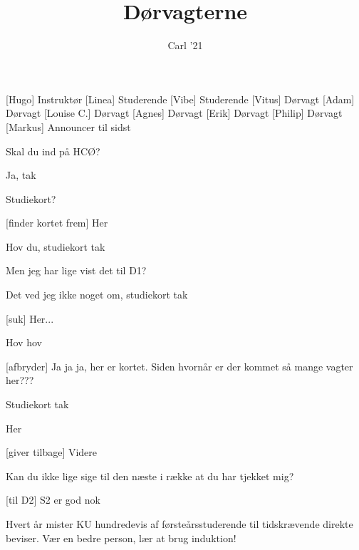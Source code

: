 \documentclass[a4paper,11pt]{article}
\title{Dørvagterne}
\author{Carl '21}
\begin{document}
\maketitle

\begin{roles}
[Hugo] Instruktør
[Linea] Studerende
[Vibe] Studerende
[Vitus] Dørvagt
[Adam] Dørvagt
[Louise C.] Dørvagt
[Agnes] Dørvagt
[Erik] Dørvagt
[Philip] Dørvagt
[Markus] Announcer til sidst
\end{roles}

\begin{sketch}

 Skal du ind på HCØ?

 Ja, tak

 Studiekort?

[finder kortet frem] Her


 Hov du, studiekort tak

 Men jeg har lige vist det til D1?

 Det ved jeg ikke noget om, studiekort tak

[suk] Her...


 Hov hov

[afbryder] Ja ja ja, her er kortet. Siden hvornår er der kommet så mange vagter her???


 Studiekort tak

 Her

[giver tilbage] Videre

 Kan du ikke lige sige til den næste i række at du har tjekket mig?

[til D2] S2 er god nok



 Hvert år mister KU hundredevis af førsteårsstuderende til tidskrævende direkte beviser. Vær en bedre person, lær at brug induktion!

\end{sketch}
\end{document}
